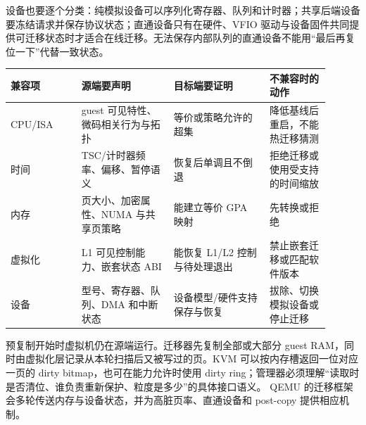 设备也要逐个分类：纯模拟设备可以序列化寄存器、队列和计时器；共享后端设备要冻结请求并保存协议状态；直通设备只有在硬件、VFIO 驱动与设备固件共同提供可迁移状态时才适合在线迁移。无法保存内部队列的直通设备不能用“最后再复位一下”代替一致状态。

\begin{longtable}{L{0.20\linewidth}L{0.26\linewidth}L{0.27\linewidth}L{0.17\linewidth}}
\toprule
兼容项 & 源端要声明 & 目标端要证明 & 不兼容时的动作 \\
\midrule
CPU/ISA & guest 可见特性、微码相关行为与拓扑 & 等价或策略允许的超集 & 降低基线后重启，不能热迁移猜测 \\\tablerowrule
时间 & TSC/计时器频率、偏移、暂停语义 & 恢复后单调且不倒退 & 拒绝迁移或使用受支持的时间缩放 \\\tablerowrule
内存 & 页大小、加密属性、NUMA 与共享页策略 & 能建立等价 GPA 映射 & 先转换或拒绝 \\\tablerowrule
虚拟化 & L1 可见控制能力、嵌套状态 ABI & 能恢复 L1/L2 控制与待处理退出 & 禁止嵌套迁移或匹配软件版本 \\\tablerowrule
设备 & 型号、寄存器、队列、DMA 和中断状态 & 设备模型/硬件支持保存与恢复 & 拔除、切换模拟设备或停止迁移 \\
\bottomrule
\end{longtable}


预复制开始时虚拟机仍在源端运行。迁移器先复制全部或大部分 guest RAM，同时由虚拟化层记录从本轮扫描后又被写过的页。KVM 可以按内存槽返回一位对应一页的 dirty bitmap，也可在能力允许时使用 dirty ring；管理器必须理解“读取时是否清位、谁负责重新保护、粒度是多少”的具体接口语义。\cite{linux-kvm-api} QEMU 的迁移框架会多轮传送内存与设备状态，并为高脏页率、直通设备和 post-copy 提供相应机制。\cite{qemu-migration}

